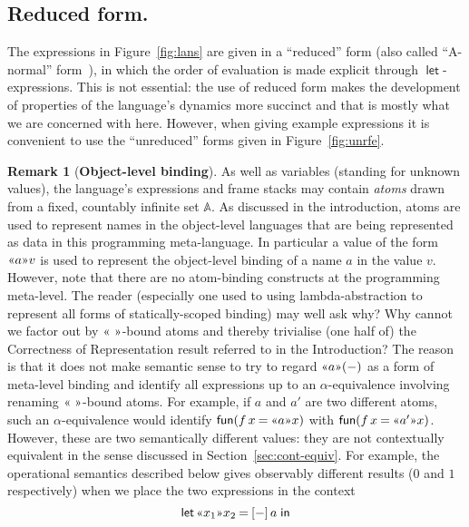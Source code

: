 \documentclass{LMCS}
\theoremstyle{plain}
\theoremstyle{definition}
\newtheorem{remark}[thm]{Remark}
\newcommand{\atm}[1][a]{#1}
\newcommand{\Atom}{\mathbb{A}}
\newcommand{\BINDVAL}[2]{\mathopen{\text{\normalfont\guillemotleft}}#1
  \mathclose{\text{\normalfont\guillemotright}}#2}
\newcommand{\EQ}{\mathbin{\kw{=}}}
\newcommand{\FUN}{\kw{fun}}
\newcommand{\IN}{\mathrel{\kw{in}}}
\newcommand{\LET}{\mathop{\kw{let}}}
\newcommand{\kw}[1]{\mathsf{#1}}
\newcommand{\val}[1][v]{#1}
\newcommand{\vid}[1][x]{#1}
\begin{document}
\subsection*{Reduced form.}

The expressions in Figure~\ref{fig:lans} are given in a ``reduced''
form (also called ``A-normal'' form~\cite{FlanaganC:esscc}), in which
the order of evaluation is made explicit through
${\LET}$-expressions. This is not essential: the use of reduced form
makes the development of properties of the language's dynamics more
succinct and that is mostly what we are concerned with here. However,
when giving example expressions it is convenient to use the
``unreduced'' forms given in Figure~\ref{fig:unrfe}.

\begin{remark}[\textbf{Object-level binding}]
  \label{rem:objlb}
  As well as variables (standing for unknown values), the language's
  expressions and frame stacks may contain \emph{atoms} drawn from a
  fixed, countably infinite set $\Atom$. As discussed in the
  introduction, atoms are used to represent names in the object-level
  languages that are being represented as data in this programming
  meta-language. In particular a value of the form
  $\BINDVAL{\atm}{\val}$ is used to represent the object-level binding
  of a name $\atm$ in the value $\val$.  However, note that there are
  no atom-binding constructs at the programming meta-level.  The
  reader (especially one used to using lambda-abstraction to represent
  all forms of statically-scoped binding) may well ask why? Why cannot
  we factor out by $\BINDVAL{\ }{}$-bound atoms and thereby trivialise
  (one half of) the Correctness of Representation result referred to
  in the Introduction?  The reason is that it does not make semantic
  sense to try to regard $\BINDVAL{\atm}{(-)}$ as a form of meta-level
  binding and identify all expressions up to an $\alpha$-equivalence
  involving renaming $\BINDVAL{\ }{}$-bound atoms.  For example, if
  $\atm$ and $\atm'$ are two different atoms, such an
  $\alpha$-equivalence would identify
  $\FUN(\vid[f]\,\vid\EQ\BINDVAL{\atm}{\vid})$ with
  $\FUN(\vid[f]\,\vid\EQ\BINDVAL{\atm'}{\vid})$. However, these are
  two semantically different values: they are not contextually
  equivalent in the sense discussed in
  Section~\ref{sec:cont-equiv}. For example, the operational semantics
  described below gives observably different results ($0$ and $1$
  respectively) when we place the two expressions in the context
  \[
  \LET {\BINDVAL{\vid_1}{\vid_2}\EQ [-]\,\atm} \IN
\]
\end{remark}
\end{document}
